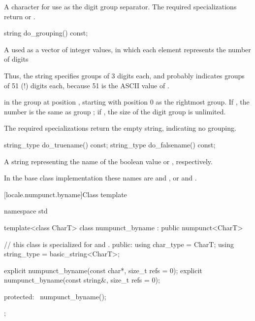 \begin{itemdescr}
\pnum
\returns
A character for use as the digit group separator.
The required specializations return  or .
\end{itemdescr}

%
\begin{itemdecl}
string do_grouping() const;
\end{itemdecl}

\begin{itemdescr}
\pnum
\returns
A   used as a vector of integer values,
in which each element  represents the number of digits
\begin{footnote}
Thus,
the string  specifies groups of 3 digits each, and
 probably indicates groups of 51 (!) digits each,
because 51 is the ASCII value of .
\end{footnote}
in the group at position ,
starting with position 0 as the rightmost group.
If ,
the number is the same as group ;
if ,
the size of the digit group is unlimited.

\pnum
The required specializations return the empty string, indicating no grouping.
\end{itemdescr}

%
%
\begin{itemdecl}
string_type do_truename()  const;
string_type do_falsename() const;
\end{itemdecl}

\begin{itemdescr}
\pnum
\returns
A string representing the name of
the boolean value  or , respectively.

\pnum
In the base class implementation
these names are  and ,
or  and .
\end{itemdescr}

[locale.numpunct.byname]{Class template }

%
\begin{codeblock}
namespace std {
  template<class CharT>
    class numpunct_byname : public numpunct<CharT> {
    // this class is specialized for  and .
    public:
      using char_type   = CharT;
      using string_type = basic_string<CharT>;

      explicit numpunct_byname(const char*, size_t refs = 0);
      explicit numpunct_byname(const string&, size_t refs = 0);

    protected:
      ~numpunct_byname();
    };
}
\end{codeblock}

